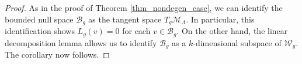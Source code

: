 \documentclass[reqno,11pt]{amsart}
\theoremstyle{tttheorem}
\begin{document}
 \begin{proof} 
 As in the proof of Theorem \ref{thm_nondegen_case}, we can 
 identify the bounded null space $\mathcal{B}_g$ as the tangent space 
 $T_g\mathcal{M}_\Lambda$. In particular, this identification shows 
 $L_g(v) = 0$ for each $v \in \mathcal{B}_g$. On the other hand, the 
 linear decomposition lemma allows us to identify $\mathcal{B}_g$
 as a $k$-dimensional subspace of $\mathcal{W}_g$. The corollary now follows.  
 \end{proof} 



\end{document}
